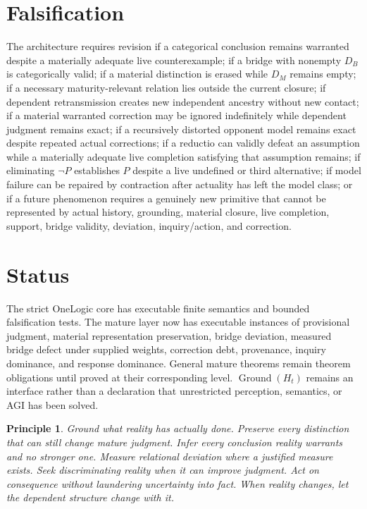 \documentclass[11pt]{article}
\newtheorem{principle}{Principle}
\begin{document}
\section{Falsification}
The architecture requires revision if a categorical conclusion remains warranted despite a materially adequate live counterexample; if a bridge with nonempty $D_B$ is categorically valid; if a material distinction is erased while $D_M$ remains empty; if a necessary maturity-relevant relation lies outside the current closure; if dependent retransmission creates new independent ancestry without new contact; if a material warranted correction may be ignored indefinitely while dependent judgment remains exact; if a recursively distorted opponent model remains exact despite repeated actual corrections; if a reductio can validly defeat an assumption while a materially adequate live completion satisfying that assumption remains; if eliminating $\neg P$ establishes $P$ despite a live undefined or third alternative; if model failure can be repaired by contraction after actuality has left the model class; or if a future phenomenon requires a genuinely new primitive that cannot be represented by actual history, grounding, material closure, live completion, support, bridge validity, deviation, inquiry/action, and correction.

\section{Status}
The strict OneLogic core has executable finite semantics and bounded falsification tests. The mature layer now has executable instances of provisional judgment, material representation preservation, bridge deviation, measured bridge defect under supplied weights, correction debt, provenance, inquiry dominance, and response dominance. General mature theorems remain theorem obligations until proved at their corresponding level. $\operatorname{Ground}(H_t)$ remains an interface rather than a declaration that unrestricted perception, semantics, or AGI has been solved.

\begin{principle}
Ground what reality has actually done. Preserve every distinction that can still change mature judgment. Infer every conclusion reality warrants and no stronger one. Measure relational deviation where a justified measure exists. Seek discriminating reality when it can improve judgment. Act on consequence without laundering uncertainty into fact. When reality changes, let the dependent structure change with it.
\end{principle}
\end{document}
